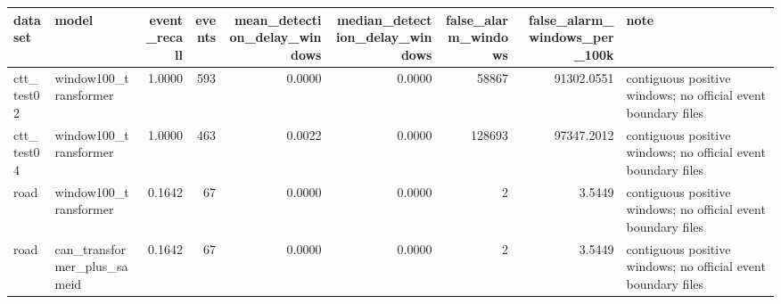\begin{tabular}{llrrrrrrl}
\toprule
dataset & model & event\_recall & events & mean\_detection\_delay\_windows & median\_detection\_delay\_windows & false\_alarm\_windows & false\_alarm\_windows\_per\_100k & note \\
\midrule
ctt\_test02 & window100\_transformer & 1.0000 & 593 & 0.0000 & 0.0000 & 58867 & 91302.0551 & contiguous positive windows; no official event boundary files \\
ctt\_test04 & window100\_transformer & 1.0000 & 463 & 0.0022 & 0.0000 & 128693 & 97347.2012 & contiguous positive windows; no official event boundary files \\
road & window100\_transformer & 0.1642 & 67 & 0.0000 & 0.0000 & 2 & 3.5449 & contiguous positive windows; no official event boundary files \\
road & can\_transformer\_plus\_sameid & 0.1642 & 67 & 0.0000 & 0.0000 & 2 & 3.5449 & contiguous positive windows; no official event boundary files \\
\bottomrule
\end{tabular}
